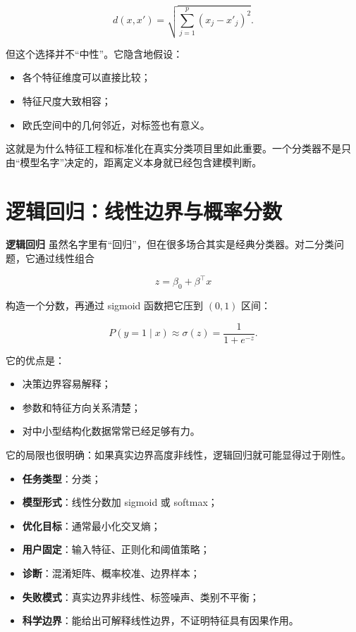 \[
d(x, x') =
\sqrt{
\sum_{j=1}^{p}
(x_j - x'_j)^2
}.
\]

但这个选择并不“中性”。它隐含地假设：

\begin{itemize}
    \item 各个特征维度可以直接比较；
    \item 特征尺度大致相容；
    \item 欧氏空间中的几何邻近，对标签也有意义。
\end{itemize}

这就是为什么特征工程和标准化在真实分类项目里如此重要。一个分类器不是只由“模型名字”决定的，距离定义本身就已经包含建模判断。

\section{逻辑回归：线性边界与概率分数}

\textbf{逻辑回归} 虽然名字里有“回归”，但在很多场合其实是经典分类器。对二分类问题，它通过线性组合

\[
z = \beta_0 + \beta^\top x
\]

构造一个分数，再通过 sigmoid 函数把它压到 $(0,1)$ 区间：

\[
P(y=1 \mid x) \approx \sigma(z) = \frac{1}{1 + e^{-z}}.
\]

它的优点是：

\begin{itemize}
    \item 决策边界容易解释；
    \item 参数和特征方向关系清楚；
    \item 对中小型结构化数据常常已经足够有力。
\end{itemize}

它的局限也很明确：如果真实边界高度非线性，逻辑回归就可能显得过于刚性。

\begin{examplebox}
\begin{itemize}
    \item \textbf{任务类型}：分类；
    \item \textbf{模型形式}：线性分数加 sigmoid 或 softmax；
    \item \textbf{优化目标}：通常最小化交叉熵；
    \item \textbf{用户固定}：输入特征、正则化和阈值策略；
    \item \textbf{诊断}：混淆矩阵、概率校准、边界样本；
    \item \textbf{失败模式}：真实边界非线性、标签噪声、类别不平衡；
    \item \textbf{科学边界}：能给出可解释线性边界，不证明特征具有因果作用。
\end{itemize}
\end{examplebox}

